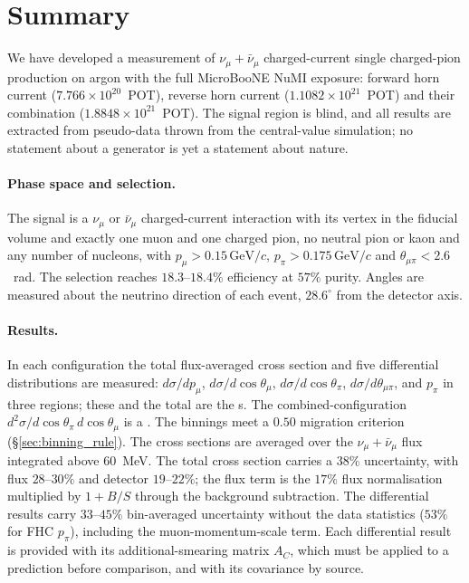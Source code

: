 \documentclass[11pt,a4paper]{article}
\newcommand{\uboone}{MicroBooNE}
\newcommand{\GeVc}{\,\text{GeV}\!/c}
\begin{document}
\section{Summary}
\label{sec:summary}

We have developed a measurement of $\nu_\mu+\bar\nu_\mu$ charged-current single charged-pion
production on argon with the full \uboone{} NuMI exposure: forward horn current
($7.766\times10^{20}$~POT), reverse horn current ($1.1082\times10^{21}$~POT) and their combination
($1.8848\times10^{21}$~POT). The signal region is blind, and all results are extracted from pseudo-data
thrown from the central-value simulation; no statement about a generator is yet a statement about
nature.

\paragraph{Phase space and selection.}
The signal is a $\nu_\mu$ or $\bar\nu_\mu$ charged-current interaction with its vertex in the fiducial
volume and exactly one muon and one charged pion, no neutral pion or kaon and any number of nucleons,
with $p_\mu>0.15\GeVc$, $p_\pi>0.175\GeVc$ and $\theta_{\mu\pi}<2.6$~rad. The selection reaches
$18.3$--$18.4\%$ efficiency at $57\%$ purity. Angles are measured about the neutrino direction of each
event, $28.6^\circ$ from the detector axis.

\paragraph{Results.}
In each configuration the total flux-averaged cross section and five differential distributions are
measured: $d\sigma/dp_\mu$, $d\sigma/d\cos\theta_\mu$, $d\sigma/d\cos\theta_\pi$,
$d\sigma/d\theta_{\mu\pi}$, and $p_\pi$ in three regions; these and the total are the
\statPrimary{}s. The combined-configuration $d^2\sigma/d\cos\theta_\pi\,d\cos\theta_\mu$ is a
\statSecondary{}. The binnings meet a $0.50$ migration criterion (\S\ref{sec:binning_rule}). The
cross sections are averaged over the $\nu_\mu+\bar\nu_\mu$ flux integrated above $60$~MeV. The total
cross section carries a $38\%$ uncertainty, with flux $28$--$30\%$ and detector $19$--$22\%$; the
flux term is the $17\%$ flux normalisation multiplied by $1+B/S$ through the background subtraction.
The differential results carry $33$--$45\%$ bin-averaged uncertainty without the data statistics
($53\%$ for FHC $p_\pi$), including the muon-momentum-scale term. Each differential result is provided
with its additional-smearing matrix $A_C$, which must be applied to a prediction before comparison,
and with its covariance by source.
\end{document}
